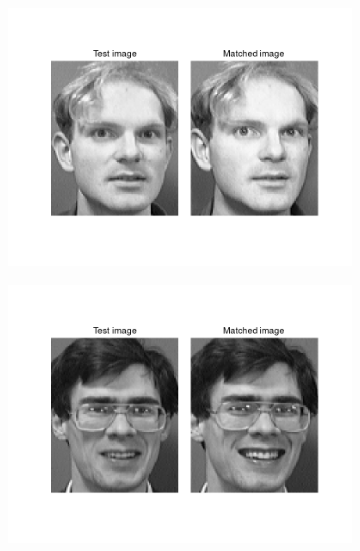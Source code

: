 \begin{homeworkProblem}
  \begin{figure}[H]
    \centering
    \begin{subfigure}{0.5\textwidth}
      \centering
      \includegraphics[width=1.\linewidth]{./images/match_1.png}
    \end{subfigure}%
    \begin{subfigure}{0.5\textwidth}
      \centering
      \includegraphics[width=1.\linewidth]{./images/match_2.png}
    \end{subfigure}
    \begin{subfigure}{0.5\textwidth}
      \centering

\end{subfigure}
\end{figure}
\end{homeworkProblem}
